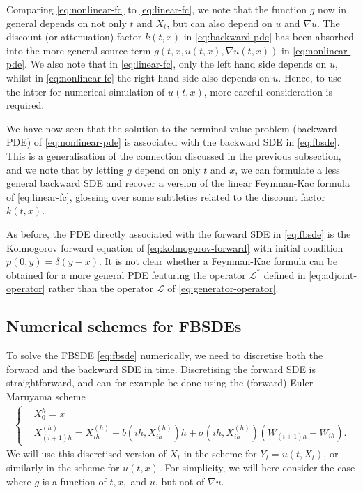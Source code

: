 \documentclass{article}  %
\begin{document}
Comparing \autoref{eq:nonlinear-fc} to \autoref{eq:linear-fc}, we note that the function $g$ now in general depends on not only $t$ and $X_t$, but can also depend on $u$ and $\nabla u$. The discount (or attenuation) factor $k(t,x)$ in \autoref{eq:backward-pde} has been absorbed into the more general source term $g(t,x,u(t,x),\nabla u(t,x))$ in \autoref{eq:nonlinear-pde}. We also note that in \autoref{eq:linear-fc}, only the left hand side depends on $u$, whilst in \autoref{eq:nonlinear-fc} the right hand side also depends on $u$. Hence, to use the latter for numerical simulation of $u(t,x)$, more careful consideration is required.

We have now seen that the solution to the terminal value problem (backward PDE) of \autoref{eq:nonlinear-pde} is associated with the backward SDE in \autoref{eq:fbsde}. This is a generalisation of the connection discussed in the previous subsection, and we note that by letting $g$ depend on only $t$ and $x$, we can formulate a less general backward SDE and recover a version of the linear Feymnan-Kac formula of \autoref{eq:linear-fc}, glossing over some subtleties related to the discount factor $k(t,x)$.

As before, the PDE directly associated with the forward SDE in \autoref{eq:fbsde} is the Kolmogorov forward equation of \autoref{eq:kolmogorov-forward} with initial condition $p(0,y)=\delta(y-x)$. It is not clear whether a Feynman-Kac formula can be obtained for a more general PDE featuring the operator $\mathcal{L}^*$ defined in \autoref{eq:adjoint-operator} rather than the operator $\mathcal{L}$ of \autoref{eq:generator-operator}.  

\subsection{Numerical schemes for FBSDEs}

To solve the FBSDE \autoref{eq:fbsde} numerically, we need to discretise both the forward and the backward SDE in time. Discretising the forward SDE is straightforward, and can for example be done using the (forward) Euler-Maruyama scheme
%
\begin{align} 
    \begin{cases}
    &X_0^{h} = x\\
    &X_{(i+1)h}^{(h)} = X_{ih}^{(h)} + b(ih,X_{ih}^{(h)}) h + \sigma(ih,X_{ih}^{(h)})(W_{(i+1)h}-W_{ih}).
    \end{cases}
\end{align}
%
We will use this discretised version of $X_t$ in the scheme for $Y_t=u(t,X_t)$, or similarly in the scheme for $u(t,x)$. For simplicity, we will here consider the case where $g$ is a function of $t,x,$ and $u$, but not of $\nabla u$.
\end{document}

